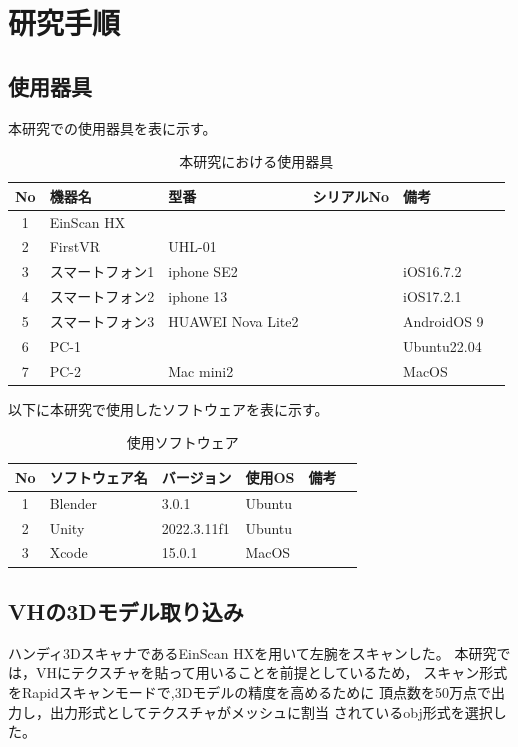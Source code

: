 \documentclass{ltjsreport}
\begin{document}
\chapter{研究手順}
	\section{使用器具}
		本研究での使用器具を表に示す。
	\begin{table}[H]
	\begin{center}
	\caption{本研究における使用器具}
	\label{tab:usedev}
	\begin{tabular}{clllll} \toprule
	No&\multicolumn{1}{l}{機器名}&\multicolumn{1}{l}{型番}&\multicolumn{1}{l}{シリアルNo}&\multicolumn{1}{l}{備考}\\ \hline
	1&EinScan HX&&&\\
	2&FirstVR&UHL-01&&\\
	3&スマートフォン1&iphone SE2&&iOS16.7.2\\
	4&スマートフォン2&iphone 13&&iOS17.2.1\\
	5&スマートフォン3&HUAWEI Nova Lite2&&AndroidOS 9\\
	6&PC-1&&&Ubuntu22.04\\
	7&PC-2&Mac mini2&&MacOS\\
	\bottomrule
	\end{tabular}
	\end{center}
	\end{table}
	以下に本研究で使用したソフトウェアを表に示す。
	\begin{table}[H]
	\begin{center}
	\caption{使用ソフトウェア}
	\label{tab:usesoft}
	\begin{tabular}{clllll} \toprule
	No&\multicolumn{1}{l}{ソフトウェア名}&\multicolumn{1}{l}{バージョン}&\multicolumn{1}{l}{使用OS}&\multicolumn{1}{l}{備考}\\ \hline
	1&Blender&3.0.1&Ubuntu&\\
	2&Unity&2022.3.11f1&Ubuntu&\\
	3&Xcode&15.0.1&MacOS&\\
	\bottomrule
	\end{tabular}
	\end{center}
	\end{table}
	\section{VHの3Dモデル取り込み}
		ハンディ3DスキャナであるEinScan HXを用いて左腕をスキャンした。
		本研究では，VHにテクスチャを貼って用いることを前提としているため，
		スキャン形式をRapidスキャンモードで,3Dモデルの精度を高めるために
		頂点数を50万点で出力し，出力形式としてテクスチャがメッシュに割当
		されているobj形式を選択した。
\end{document}
